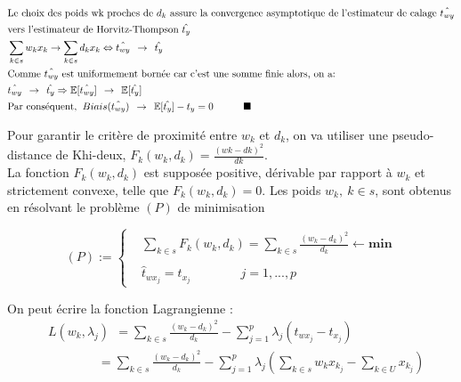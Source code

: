 \documentclass[11pt,fleqn]{book} %
\begin{document}
\begin{align*}
& \textnormal{Le choix des poids wk proches de $d_k$ assure la convergence asymptotique de l'estimateur de calage $\hat{t_{wy}}$}\\ 
& \textnormal{vers l'estimateur de Horvitz-Thompson $\hat{t_y}$ }\\
& \sum_{k\in s} w_k x_k \rightarrow \sum_{k\in s} d_k x_k \Leftrightarrow \hat{t_{wy}} \:\: \rightarrow \:\: \hat{t_y}\\ 
& \textnormal{Comme $ \hat{t_{wy}}$ est uniformement bornée car c'est une somme finie alors, on a:}\\
& \hat{t_{wy}} \:\: \rightarrow \:\: \hat{t_y} \Rightarrow
\mathbb{E}[\hat{t_{wy}}] \:\: \rightarrow \:\: \mathbb{E}[\hat{t_y}]\\
& \textnormal{Par conséquent, } \: Biais(\hat{t_{wy}}) \:\: \rightarrow \:\: \mathbb{E}[\hat{t_y}]-t_y=0 \quad\quad\quad \blacksquare
\end{align*}


\newpage 

Pour garantir le critère de proximité entre $w_k$ et $d_k$, on va utiliser une pseudo-distance de Khi-deux, $ F_k(w_k,d_k)=\frac{(wk-dk)^2}{dk}$.\\ 
La fonction $F_k(w_k,d_k)$ est supposée positive, dérivable par rapport à $w_k$ et strictement convexe, telle que $F_k(w_k,d_k)=0$. Les poids $w_k,\: k\in s$, sont obtenus en résolvant le problème $(P)$ de minimisation

\begin{equation*}
(P) :=\left\{\begin{aligned} & \sum_{k\in s} F_k(w_k,d_k)=\sum_{k\in s} \frac{(w_k-d_k)^2}{d_k} \leftarrow \textbf{min}\\
 \\ & \hat{t}_{wx_j}=t_{x_j}  \quad\quad\quad\quad j=1,...,p \end{aligned}\right.
\end{equation*}


On peut écrire la fonction Lagrangienne :
\begin{align*}
&  L(w_k,\lambda_j) \:\:= \sum_{k\in s} \frac{(w_k-d_k)^2}{d_k}-\sum_{j=1}^p \lambda_j(\hat{t}_{wx_j}-t_{x_j})\\ 
& \quad\quad\quad\quad = \sum_{k\in s} \frac{(w_k-d_k)^2}{d_k}-\sum_{j=1}^p \lambda_j\left(\sum_{k\in s} w_k x_{k_j} -  \sum_{k\in U}x_{k_j}\right)
\end{align*}
\end{document}
